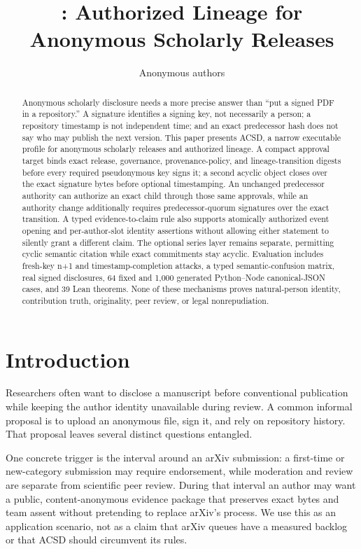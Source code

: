 \documentclass[11pt]{article}
\title{\acsd: Authorized Lineage for Anonymous Scholarly Releases}
\author{Anonymous authors}
\date{}
\newcommand{\acsd}{\textsc{ACSD}}
\begin{document}
\maketitle

\begin{abstract}
Anonymous scholarly disclosure needs a more precise answer than ``put a signed PDF in a repository.'' A signature identifies a signing key, not necessarily a person; a repository timestamp is not independent time; and an exact predecessor hash does not say who may publish the next version. This paper presents \acsd, a narrow executable profile for anonymous scholarly releases and authorized lineage. A compact approval target binds exact release, governance, provenance-policy, and lineage-transition digests before every required pseudonymous key signs it; a second acyclic object closes over the exact signature bytes before optional timestamping. An unchanged predecessor authority can authorize an exact child through those same approvals, while an authority change additionally requires predecessor-quorum signatures over the exact transition. A typed evidence-to-claim rule also supports atomically authorized event opening and per-author-slot identity assertions without allowing either statement to silently grant a different claim. The optional series layer remains separate, permitting cyclic semantic citation while exact commitments stay acyclic. Evaluation includes fresh-key n+1 and timestamp-completion attacks, a typed semantic-confusion matrix, real signed disclosures, 64 fixed and 1,000 generated Python--Node canonical-JSON cases, and 39 Lean theorems. None of these mechanisms proves natural-person identity, contribution truth, originality, peer review, or legal nonrepudiation.
\end{abstract}

\section{Introduction}

Researchers often want to disclose a manuscript before conventional publication while keeping the author identity unavailable during review. A common informal proposal is to upload an anonymous file, sign it, and rely on repository history. That proposal leaves several distinct questions entangled.

One concrete trigger is the interval around an arXiv submission: a first-time or
new-category submission may require endorsement, while moderation and review
are separate from scientific peer review. During that interval an author may
want a public, content-anonymous evidence package that preserves exact bytes
and team assent without pretending to replace arXiv's process. We use this as
an application scenario, not as a claim that arXiv queues have a measured
backlog or that ACSD should circumvent its rules.
\end{document}
